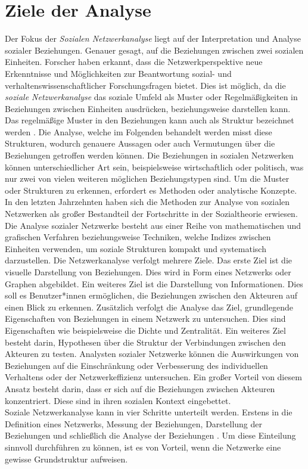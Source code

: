 \section{Ziele der Analyse}
Der Fokus der \textit{Sozialen Netzwerkanalyse} liegt auf der Interpretation und Analyse sozialer Beziehungen. Genauer gesagt, auf die Beziehungen zwischen zwei sozialen Einheiten. Forscher haben erkannt, dass die Netzwerkperspektive neue Erkenntnisse und Möglichkeiten zur Beantwortung sozial- und verhaltenswissenschaftlicher Forschungsfragen bietet. Dies ist möglich, da die \textit{soziale Netzwerkanalyse} das soziale Umfeld als Muster oder Regelmäßigkeiten in Beziehungen zwischen Einheiten ausdrücken, beziehungsweise darstellen kann. Das regelmäßige Muster in den Beziehungen kann auch als Struktur bezeichnet werden \cite{wasserman1994social}. Die Analyse, welche im Folgenden behandelt werden misst diese Strukturen, wodurch genauere Aussagen oder auch Vermutungen über die Beziehungen getroffen werden können. Die Beziehungen in sozialen Netzwerken können unterschiedlicher Art sein, beispielsweise wirtschaftlich oder politisch, was nur zwei von vielen weiteren möglichen Beziehungstypen sind. Um die Muster oder Strukturen zu erkennen, erfordert es Methoden oder analytische Konzepte. In den letzten Jahrzehnten haben sich die Methoden zur Analyse von sozialen Netzwerken als großer Bestandteil der Fortschritte in der Sozialtheorie erwiesen.
Die Analyse sozialer Netzwerke besteht aus einer Reihe von mathematischen und grafischen Verfahren beziehungsweise Techniken, welche Indizes zwischen Einheiten verwenden, um soziale Strukturen kompakt und systematisch darzustellen.
Die Netzwerkanalyse verfolgt mehrere Ziele. Das erste Ziel ist die visuelle Darstellung von Beziehungen. Dies wird in Form eines Netzwerks oder Graphen abgebildet. Ein weiteres Ziel ist die Darstellung von Informationen. Dies soll es Benutzer*innen ermöglichen, die Beziehungen zwischen den Akteuren auf einen Blick zu erkennen. Zusätzlich verfolgt die Analyse das Ziel, grundlegende Eigenschaften von Beziehungen in einem Netzwerk zu untersuchen. Dies sind Eigenschaften wie beispielsweise die Dichte und Zentralität. Ein weiteres Ziel besteht darin, Hypothesen über die Struktur der Verbindungen zwischen den Akteuren zu testen. Analysten sozialer Netzwerke können die Auswirkungen von Beziehungen auf die Einschränkung oder Verbesserung des individuellen Verhaltens oder der Netzwerkeffizienz untersuchen. Ein großer Vorteil von diesem Ansatz besteht darin, dass er sich auf die Beziehungen zwischen Akteuren konzentriert. Diese sind in ihren sozialen Kontext eingebettet.\\
Soziale Netzwerkanalyse kann in vier Schritte unterteilt werden. Erstens in die Definition eines Netzwerks, Messung der Beziehungen, Darstellung der Beziehungen und schließlich die Analyse der Beziehungen \cite{wasserman1994social}. Um diese Einteilung sinnvoll durchführen zu können, ist es von Vorteil, wenn die Netzwerke eine gewisse Grundstruktur aufweisen.


